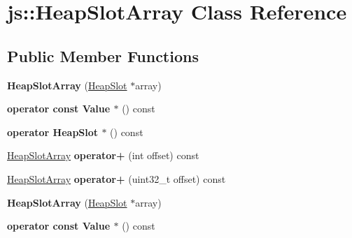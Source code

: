 \hypertarget{classjs_1_1_heap_slot_array}{\section{js\-:\-:Heap\-Slot\-Array Class Reference}
\label{classjs_1_1_heap_slot_array}
}
\subsection*{Public Member Functions}
\begin{DoxyCompactItemize}
\item 
\hypertarget{classjs_1_1_heap_slot_array_a4f3515f8848489ced4286bbdba0d4301}{{\bfseries Heap\-Slot\-Array} (\hyperlink{classjs_1_1_heap_slot}{Heap\-Slot} $\ast$array)}\label{classjs_1_1_heap_slot_array_a4f3515f8848489ced4286bbdba0d4301}

\item 
\hypertarget{classjs_1_1_heap_slot_array_a8eeb6d499befeba5aa334c9e3fd248b2}{{\bfseries operator const Value $\ast$} () const }\label{classjs_1_1_heap_slot_array_a8eeb6d499befeba5aa334c9e3fd248b2}

\item 
\hypertarget{classjs_1_1_heap_slot_array_a951154e56cdfd668723ed4d1c0f949b8}{{\bfseries operator Heap\-Slot $\ast$} () const }\label{classjs_1_1_heap_slot_array_a951154e56cdfd668723ed4d1c0f949b8}

\item 
\hypertarget{classjs_1_1_heap_slot_array_a6fcb0a18f554f13810d1240e1655a1ec}{\hyperlink{classjs_1_1_heap_slot_array}{Heap\-Slot\-Array} {\bfseries operator+} (int offset) const }\label{classjs_1_1_heap_slot_array_a6fcb0a18f554f13810d1240e1655a1ec}

\item 
\hypertarget{classjs_1_1_heap_slot_array_a4db1c782593ccb48a6eea35077ce1296}{\hyperlink{classjs_1_1_heap_slot_array}{Heap\-Slot\-Array} {\bfseries operator+} (uint32\-\_\-t offset) const }\label{classjs_1_1_heap_slot_array_a4db1c782593ccb48a6eea35077ce1296}

\item 
\hypertarget{classjs_1_1_heap_slot_array_a4f3515f8848489ced4286bbdba0d4301}{{\bfseries Heap\-Slot\-Array} (\hyperlink{classjs_1_1_heap_slot}{Heap\-Slot} $\ast$array)}\label{classjs_1_1_heap_slot_array_a4f3515f8848489ced4286bbdba0d4301}

\item 
\hypertarget{classjs_1_1_heap_slot_array_a8eeb6d499befeba5aa334c9e3fd248b2}{{\bfseries operator const Value $\ast$} () const }\label{classjs_1_1_heap_slot_array_a8eeb6d499befeba5aa334c9e3fd248b2}


\end{DoxyCompactItemize}
